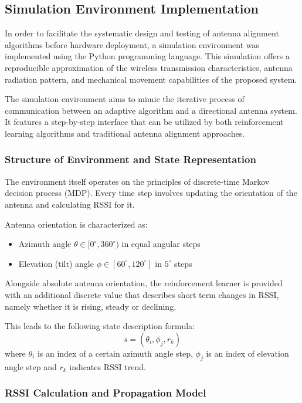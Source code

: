 \subsection{Simulation Environment Implementation}

In order to facilitate the systematic design and testing of antenna
alignment algorithms before hardware deployment, a simulation environment was
implemented using the Python programming language. This simulation offers a
reproducible approximation of the wireless transmission characteristics,
antenna radiation pattern, and mechanical movement capabilities of the
proposed system.

The simulation environment aims to mimic the iterative process of
communication between an adaptive algorithm and a directional antenna
system. It features a step-by-step interface that can be utilized by both
reinforcement learning algorithms and traditional antenna alignment
approaches.

\subsubsection{Structure of Environment and State Representation}

The environment itself operates on the principles of discrete-time Markov
decision process (MDP). Every time step involves updating the orientation of the
antenna and calculating RSSI for it.

Antenna orientation is characterized as:
\begin{itemize}
    \item Azimuth angle $\theta \in [0^\circ, 360^\circ)$ in equal angular steps 
    \item Elevation (tilt) angle $\phi \in [60^\circ, 120^\circ]$ in $5^\circ$ steps
\end{itemize}

Alongside absolute antenna orientation, the reinforcement learner is provided with an
additional discrete value that describes short term changes in RSSI, namely whether it is rising, steady or declining. 

This leads to the following state description formula:
\begin{equation}
    s = (\theta_i, \phi_j, r_k)
\end{equation}
where $\theta_i$ is an index of a certain azimuth angle step, $\phi_j$ is an index of elevation angle step and $r_k$ indicates RSSI trend.

\subsubsection{RSSI Calculation and Propagation Model}

